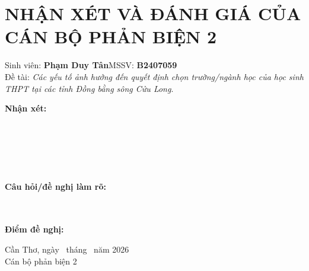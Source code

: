 \chapter*{NHẬN XÉT VÀ ĐÁNH GIÁ CỦA CÁN BỘ PHẢN BIỆN 2}\thispagestyle{empty}
\noindent Sinh viên: \textbf{Phạm Duy Tân}\hfill MSSV: \textbf{B2407059}\\
\noindent Đề tài: \textit{Các yếu tố ảnh hưởng đến quyết định chọn trường/ngành học của học sinh THPT tại các tỉnh Đồng bằng sông Cửu Long}.
\vspace{0.6cm}

\noindent\textbf{Nhận xét:}\\[0.3cm]
\dotfill\\[0.55cm]\dotfill\\[0.55cm]\dotfill\\[0.55cm]\dotfill\\[0.55cm]\dotfill\\[0.55cm]\dotfill

\noindent\textbf{Câu hỏi/đề nghị làm rõ:}\\[0.3cm]
\dotfill\\[0.55cm]\dotfill\\[0.55cm]\dotfill

\noindent\textbf{Điểm đề nghị:} \dotfill
\vfill
\begin{flushright}Cần Thơ, ngày \dotfill\ tháng \dotfill\ năm 2026\\Cán bộ phản biện 2\\[2cm]\dotfill\end{flushright}
